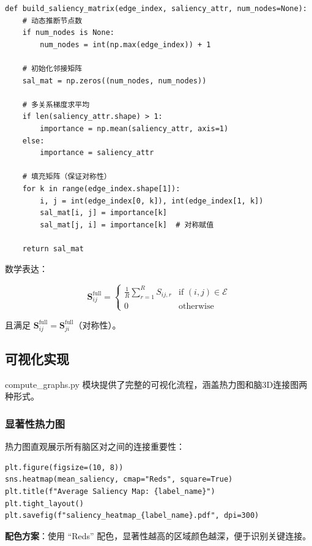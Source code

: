 \documentclass[UTF8, a4paper, 12pt]{article}
\begin{document}
\begin{verbatim}
def build_saliency_matrix(edge_index, saliency_attr, num_nodes=None):
    # 动态推断节点数
    if num_nodes is None:
        num_nodes = int(np.max(edge_index)) + 1
    
    # 初始化邻接矩阵
    sal_mat = np.zeros((num_nodes, num_nodes))
    
    # 多关系梯度求平均
    if len(saliency_attr.shape) > 1:
        importance = np.mean(saliency_attr, axis=1)
    else:
        importance = saliency_attr

    # 填充矩阵（保证对称性）
    for k in range(edge_index.shape[1]):
        i, j = int(edge_index[0, k]), int(edge_index[1, k])
        sal_mat[i, j] = importance[k]
        sal_mat[j, i] = importance[k]  # 对称赋值
        
    return sal_mat
\end{verbatim}

数学表达：

\begin{equation}
\mathbf{S}^{\text{full}}_{ij} = \begin{cases}
\frac{1}{R} \sum_{r=1}^{R} S_{ij,r} & \text{if } (i,j) \in \mathcal{E} \\
0 & \text{otherwise}
\end{cases}
\end{equation}

且满足 $\mathbf{S}^{\text{full}}_{ij} = \mathbf{S}^{\text{full}}_{ji}$（对称性）。

\subsection{可视化实现}

compute\_graphs.py 模块提供了完整的可视化流程，涵盖热力图和脑3D连接图两种形式。

\subsubsection{显著性热力图}

热力图直观展示所有脑区对之间的连接重要性：

\begin{verbatim}
plt.figure(figsize=(10, 8))
sns.heatmap(mean_saliency, cmap="Reds", square=True)
plt.title(f"Average Saliency Map: {label_name}")
plt.tight_layout()
plt.savefig(f"saliency_heatmap_{label_name}.pdf", dpi=300)
\end{verbatim}

\textbf{配色方案}：使用 ``Reds'' 配色，显著性越高的区域颜色越深，便于识别关键连接。
\end{document}
